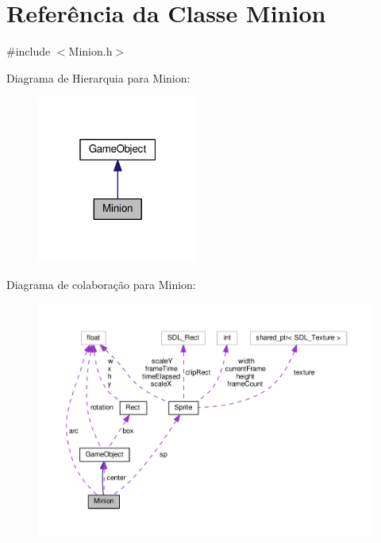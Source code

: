 \hypertarget{classMinion}{\section{Referência da Classe Minion}
\label{classMinion}
}


{\ttfamily \#include $<$Minion.\+h$>$}



Diagrama de Hierarquia para Minion\+:\nopagebreak
\begin{figure}[H]
\begin{center}
\leavevmode
\includegraphics[width=151pt]{classMinion__inherit__graph}
\end{center}
\end{figure}


Diagrama de colaboração para Minion\+:
\nopagebreak
\begin{figure}[H]
\begin{center}
\leavevmode
\includegraphics[width=350pt]{classMinion__coll__graph}
\end{center}
\end{figure}
